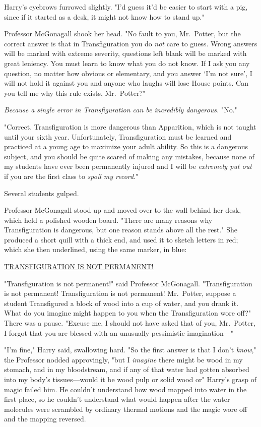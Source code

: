 Harry's eyebrows furrowed slightly. "I'd guess it'd be easier to start with a
pig, since if it started as a desk, it might not know how to stand up."

Professor McGonagall shook her head. "No fault to you, Mr.~Potter, but the
correct answer is that in Transfiguration you do \emph{not} care to guess.
Wrong answers will be marked with extreme severity, questions left blank will
be marked with great leniency. You must learn to know what you do not know. If
I ask you any question, no matter how obvious or elementary, and you answer
`I'm not sure', I will not hold it against you and anyone who laughs will lose
House points. Can you tell me why this rule exists, Mr.~Potter?"

\emph{Because a single error in Transfiguration can be incredibly dangerous.}
"No."

"Correct. Transfiguration is more dangerous than Apparition, which is not
taught until your sixth year. Unfortunately, Transfiguration must be learned
and practiced at a young age to maximize your adult ability. So this is a
dangerous subject, and you should be quite scared of making any mistakes,
because none of my students have ever been permanently injured and I will be
\emph{extremely put out} if you are the first class to \emph{spoil my record}."

Several students gulped.

Professor McGonagall stood up and moved over to the wall behind her desk, which
held a polished wooden board. "There are many reasons why Transfiguration is
dangerous, but one reason stands above all the rest." She produced a short
quill with a thick end, and used it to sketch letters in red; which she then
underlined, using the same marker, in blue:

\begin{center}
\underline{TRANSFIGURATION IS NOT PERMANENT!}
\end{center}

"Transfiguration is not permanent!" said Professor McGonagall. "Transfiguration
is not permanent! Transfiguration is not permanent! Mr.~Potter, suppose a
student Transfigured a block of wood into a cup of water, and you drank it.
What do you imagine might happen to you when the Transfiguration wore off?"
There was a pause. "Excuse me, I should not have asked that of you, Mr.~Potter,
I forgot that you are blessed with an unusually pessimistic imagination---"

"I'm fine," Harry said, swallowing hard. "So the first answer is that I don't
\emph{know}," the Professor nodded approvingly, "but I \emph{imagine} there
might be{\el} wood in my stomach, and in my bloodstream, and if any of that
water had gotten absorbed into my body's tissues---would it be wood pulp or
solid wood or{\el}" Harry's grasp of magic failed him. He couldn't
understand how wood mapped into water in the first place, so he couldn't
understand what would happen after the water molecules were scrambled by
ordinary thermal motions and the magic wore off and the mapping reversed.

